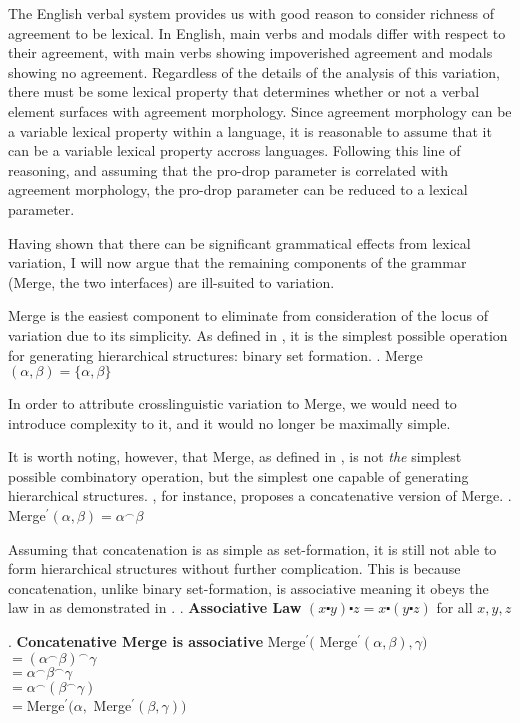 \documentclass[MilwayThesis]{subfiles}
\begin{document}
The English verbal system provides us with good reason to consider richness of agreement to be lexical.
In English, main verbs and modals differ with respect to their agreement, with main verbs showing impoverished agreement and modals showing no agreement.
Regardless of the details of the analysis of this variation, there must be some lexical property that determines whether or not a verbal element surfaces with agreement morphology.
Since agreement morphology can be a variable lexical property within a language, it is reasonable to assume that it can be a variable lexical property accross languages.
Following this line of reasoning, and assuming that the pro-drop parameter is correlated with agreement morphology, the pro-drop parameter can be reduced to a lexical parameter.

Having shown that there can be significant grammatical effects from lexical variation, I will now argue that the remaining components of the grammar (Merge, the two interfaces) are ill-suited to variation.

Merge is the easiest component to eliminate from consideration of the locus of variation due to its simplicity.
As defined in \Next, it is the simplest possible operation for generating hierarchical structures: binary set formation.
\ex. Merge$(\alpha, \beta) = \{ \alpha, \beta\}$

In order to attribute crosslinguistic variation to Merge, we would need to introduce complexity to it, and it would no longer be maximally simple.

It is worth noting, however, that Merge, as defined in \Last, is not \textit{the} simplest possible combinatory operation, but the simplest one capable of generating hierarchical structures.
\textcite{hornstein2009theory}, for instance, proposes a concatenative version of Merge.
\ex. Merge$^\prime(\alpha, \beta) = \alpha^\frown\beta$

Assuming that concatenation is as simple as set-formation, it is still not able to form hierarchical structures without further complication.
This is because concatenation, unlike binary set-formation, is associative meaning it obeys the law in \Next as demonstrated in \NNext.
\ex. \textbf{Associative Law}
$(x \centerdot y) \centerdot z = x \centerdot (y \centerdot z)$ for all $x,y,z$

\ex. \textbf{Concatenative Merge is associative}
Merge$^\prime($ Merge$^\prime(\alpha, \beta), \gamma)$\\
$= (\alpha^\frown\beta)^\frown\gamma$\\
$= \alpha^\frown\beta^\frown\gamma$\\
$= \alpha^\frown(\beta^\frown\gamma)$\\
$= $Merge$^\prime(\alpha, $ Merge$^\prime(\beta, \gamma))$
\end{document}
